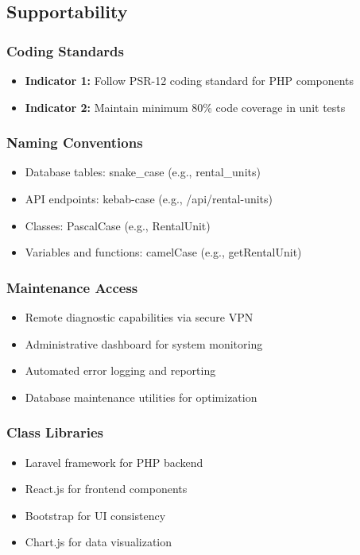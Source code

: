 \documentclass[12pt]{article}
\begin{document}
\subsection{Supportability}

\subsubsection{Coding Standards}
\begin{itemize}
    \item \textbf{Indicator 1:} Follow PSR-12 coding standard for PHP components
    \item \textbf{Indicator 2:} Maintain minimum 80\% code coverage in unit tests
\end{itemize}

\subsubsection{Naming Conventions}
\begin{itemize}
    \item Database tables: snake\_case (e.g., rental\_units)
    \item API endpoints: kebab-case (e.g., /api/rental-units)
    \item Classes: PascalCase (e.g., RentalUnit)
    \item Variables and functions: camelCase (e.g., getRentalUnit)
\end{itemize}

\subsubsection{Maintenance Access}
\begin{itemize}
    \item Remote diagnostic capabilities via secure VPN
    \item Administrative dashboard for system monitoring
    \item Automated error logging and reporting
    \item Database maintenance utilities for optimization
\end{itemize}

\subsubsection{Class Libraries}
\begin{itemize}
    \item Laravel framework for PHP backend
    \item React.js for frontend components
    \item Bootstrap for UI consistency
    \item Chart.js for data visualization
\end{itemize}
\end{document}
